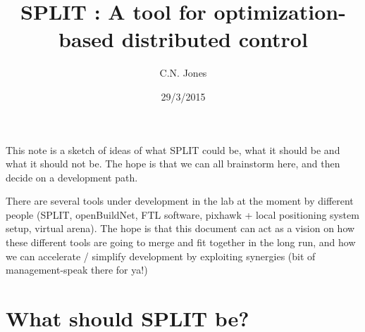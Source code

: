 \documentclass[11pt,a4paper]{article}
\title{SPLIT : A tool for optimization-based distributed control}
\date{29/3/2015}
\author{C.N. Jones}
\begin{document}
\maketitle

This note is a sketch of ideas of what SPLIT could be, what it should be and what it should not be. The hope is that we can all brainstorm here, and then decide on a development path.

There are several tools under development in the lab at the moment by different people (SPLIT, openBuildNet, FTL software, pixhawk + local positioning system setup, virtual arena). The hope is that this document can act as a vision on how these different tools are going to merge and fit together in the long run, and how we can accelerate / simplify development by exploiting synergies (bit of management-speak there for ya!)

\section*{What should SPLIT be?}

\begin{center}
\end{center}
\end{document}
